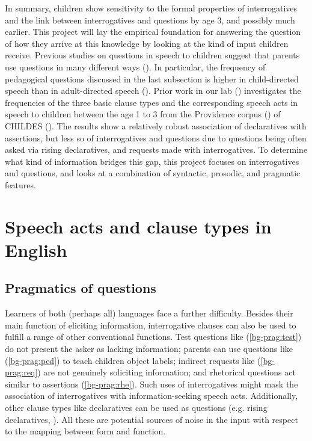 \noindent In summary, children show sensitivity to the formal properties of interrogatives and the link between interrogatives and questions by age 3, and possibly much earlier. This project will lay the empirical foundation for answering the question of how they arrive at this knowledge by looking at the kind of input children receive. Previous studies on questions in speech to children suggest that parents use questions in many different ways (\citealt{holzman1972, shatz1979, tamir1980, yu2019pedagogical}). In particular, the frequency of pedagogical questions discussed in the last subsection is higher in child-directed speech than in adult-directed speech (\citealt{stivers2010}). Prior work in our lab (\citealt{zaitsu2020}) investigates the frequencies of the three basic clause types and the corresponding speech acts in speech to children between the age 1 to 3 from the Providence corpus (\citealt{ProvidenceCorpus}) of CHILDES (\citealt{CHILDES}). The results show a relatively robust association of declaratives with assertions, but less so of interrogatives and questions due to questions being often asked via rising declaratives, and requests made with interrogatives. To determine what kind of information bridges this gap, this project focuses on interrogatives and questions, and looks at a combination of syntactic, prosodic, and pragmatic features.




\section{Speech acts and clause types in English}

	\subsection{Pragmatics of questions}\label{bg:prag}
Learners of both (perhaps all) languages face a further difficulty. Besides their main function of eliciting information, interrogative clauses can also be used to fulfill a range of other conventional functions. Test questions like (\ref{bg-prag:test}) do not present the asker as lacking information; parents can use questions like (\ref{bg-prag:ped}) to teach children object labels; indirect requests like (\ref{bg-prag:req}) are not genuinely soliciting information; and rhetorical questions act similar to assertions (\ref{bg-prag:rhe}). Such uses of interrogatives might mask the association of interrogatives with information-seeking speech acts. Additionally, other clause types like declaratives can be used as questions (e.g. rising declaratives, \citealt{gunlogson2004,gunlogson2008,jeong2018,rudin2018}). All these are potential sources of noise in the input with respect to the mapping between form and function.

